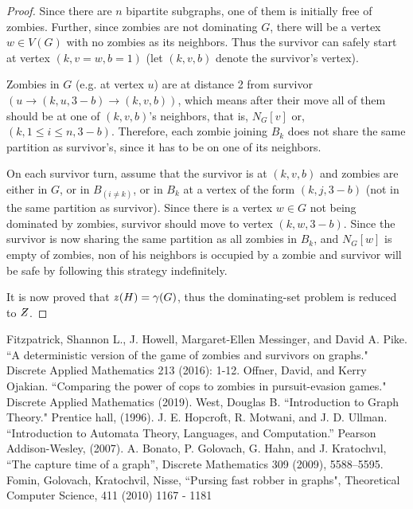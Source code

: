 \documentclass[1p]{elsarticle}
\newcommand{\NPZ}{\ooalign{$Z$\cr\hfil\rule[.8ex]{.3em}{.09ex}\hfil\cr}}
\newcommand{\zn}{\ooalign{$z$\cr\hfil\rule[.5ex]{.2em}{.08ex}\hfil\cr}}
\begin{document}
\begin{proof}
		Since there are $n$ bipartite subgraphs, one of them is initially free of zombies. Further, since zombies are
		not dominating $G$, there will be a vertex $w \in V(G)$ with no zombies as its neighbors. Thus the survivor can
		safely start at vertex $(k,v = w,b = 1)$ (let $(k,v,b)$ denote the survivor's vertex).

		Zombies in $G$ (e.g. at vertex $u$) are at distance 2 from survivor $(u \rightarrow (k,u,3 - b) \rightarrow
		(k,v,b))$, which means after their move all of them should be at one of $(k,v,b)$'s neighbors, that is, $N_G[v]
		$ or, $ (k,1 \leq i \leq n,3 - b)$. Therefore, each zombie joining $B_k$ does not share the same partition as
		survivor's, since it has to be on one of its neighbors.
		
		On each survivor turn, assume that the survivor is at $(k,v,b)$ and zombies are either in $G$, or in $B_{(i \neq
		k)}$, or in $B_k$ at a vertex of the form $(k,j,3-b)$ (not in the same partition as survivor). Since there is a
		vertex $w \in G$ not being dominated by zombies, survivor should move to vertex $(k,w,3-b)$. Since the survivor
		is now sharing the same partition as all zombies in $B_k$, and $N_G[w]$ is empty of zombies, non of his
		neighbors is occupied by a zombie and survivor will be safe by following this strategy indefinitely.

		It is now proved that $\zn(H) = \gamma(G)$, thus the dominating-set problem is reduced to $\NPZ$.

	\end{proof}
\begin{thebibliography}{999}
	
	Fitzpatrick, Shannon L., J. Howell, Margaret-Ellen Messinger, and David A. Pike. ``A deterministic version of the
	game of zombies and survivors on graphs." Discrete Applied Mathematics 213 (2016): 1-12.
	Offner, David, and Kerry Ojakian. ``Comparing the power of cops to zombies in pursuit-evasion games." Discrete
	Applied Mathematics (2019).
	West, Douglas B. ``Introduction to Graph Theory." Prentice hall, (1996).
	J. E. Hopcroft, R. Motwani, and J. D. Ullman. ``Introduction to Automata Theory, Languages, and Computation.''
	Pearson Addison-Wesley, (2007).
	A. Bonato, P. Golovach, G. Hahn, and J. Kratochvıl, ``The capture time of a graph'', Discrete Mathematics 309 (2009), 5588–5595.
	Fomin, Golovach, Kratochvil, Nisse, ``Pursing fast robber in graphs", Theoretical Computer Science, 411 (2010) 1167 - 1181
\end{thebibliography}
\end{document}
